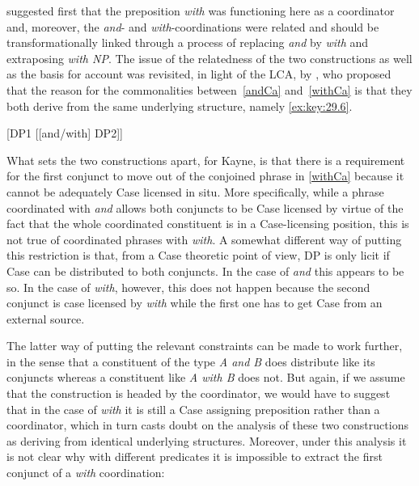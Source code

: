 \documentclass[output=paper]{langsci/langscibook}
\begin{document}
\ea\label{ex:key:29.5}
    \z
\z

\cite{lakoff-peters:69} suggested first that the preposition \emph{with} was
functioning here as a coordinator and, moreover, the \emph{and}- and
\emph{with}-coordinations were related and should be transformationally linked
through a process of replacing \emph{and} by \emph{with} and extraposing
\emph{with NP}.  The issue of the relatedness of the two constructions as well
as the basis for  account was revisited, in light of
the \gls{LCA}, by
\cite[§6.3]{Kayne1994}, who proposed that the reason for the commonalities
between~\eqref{andCa} and~\eqref{withCa} is that they both derive from the same
underlying structure, namely \eqref{ex:key:29.6}.

\ea\label{ex:key:29.6}
    {}[DP1 [[and/with] DP2]]
\z

What sets the two constructions apart, for Kayne, is that there is a
requirement for the first conjunct to move out of the conjoined phrase in
\eqref{withCa} because it cannot be adequately Case licensed in situ. More
specifically, while a phrase coordinated with \emph{and} allows both
conjuncts to be Case licensed by virtue of the fact that the whole coordinated
constituent is in a Case-licensing position, this is not true of coordinated
phrases with \emph{with}. A somewhat different way of putting this
restriction is that, from a Case theoretic point of view, DP  is
only licit if Case can be distributed to both conjuncts. In the case of
\emph{and} this appears to be so. In the case of \emph{with}, however,
this does not happen because the second conjunct is case licensed by
\emph{with} while the first one has to get Case from an external source.

The latter way of putting the relevant constraints can be made to work further,
in the sense that a constituent of the type \emph{A and B} does distribute like
its conjuncts whereas a constituent like \emph{A with B} does not. But again,
if we assume that the construction is headed by the coordinator, we would have
to suggest that in the case of \emph{with} it is still a Case assigning
preposition rather than a coordinator, which in turn casts doubt on the
analysis of these two constructions as deriving from identical underlying
structures. Moreover, under this analysis it is not clear why with different
predicates it is impossible to extract the first conjunct of a \emph{with}
coordination:
\end{document}
